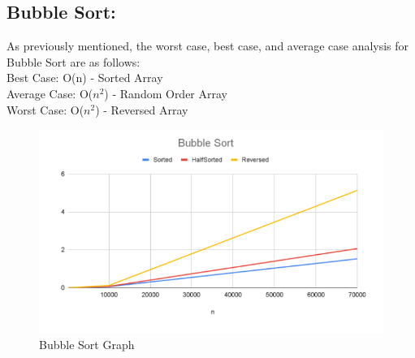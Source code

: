 \documentclass[12pt]{article}
\begin{document}
	\subsection{Bubble Sort:}

	As previously mentioned, the worst case, best case, and average case analysis for Bubble Sort are as follows: \\

	\indent Best Case: O(n) - Sorted Array\\
	\indent	Average Case: O($n^2$) - Random Order Array\\
	\indent	Worst Case: O($n^2$) - Reversed Array\\

\begin{figure}[h]
	\centering
	\includegraphics[width=\textwidth]{Bubble Sort.PNG}
\caption{Bubble Sort Graph}
    \label{fig:mesh1}
\end{figure}
\end{document}
